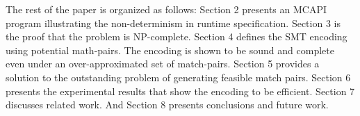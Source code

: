 The rest of the paper is organized as follows: Section 2 presents an
MCAPI program illustrating the non-determinism in runtime
specification. Section 3 is the proof that the problem is
NP-complete. Section 4 defines the SMT encoding using potential
math-pairs. The encoding is shown to be sound and complete even under
an over-approximated set of match-pairs. Section 5 provides a solution
to the outstanding problem of generating feasible match pairs. Section
6 presents the experimental results that show the encoding to be
efficient. Section 7 discusses related work. And Section 8 presents
conclusions and future work.

